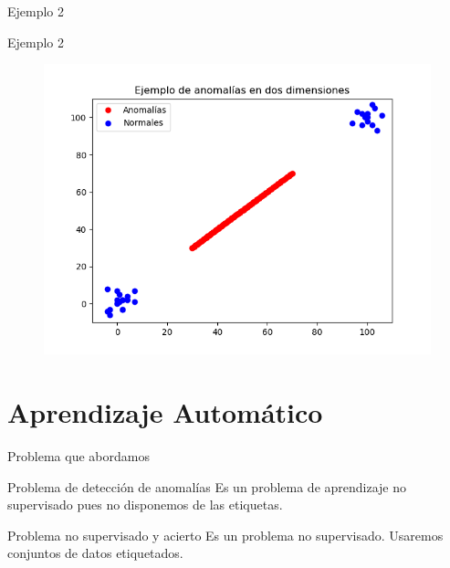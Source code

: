 \documentclass[10pt]{beamer}
\begin{document}
\begin{frame}[fragile]{Ejemplo 2}
\vspace{10px}
\centering
{}

\end{frame}

\begin{frame}[fragile]{Ejemplo 2}
\vspace{10px}

\begin{figure}
\centering
\includegraphics[scale=0.6]{Imagenes/outlier-2d-case2.png}
\end{figure}

\end{frame}

\section{Aprendizaje Automático}

\begin{frame}[fragile]{Problema que abordamos}
\vspace{10px}
\pause
{}

\begin{alertblock}{Problema de detección de anomalías}
	Es un problema de aprendizaje no supervisado pues no disponemos de las etiquetas.
\end{alertblock}

\pause

\begin{alertblock}{Problema no supervisado y acierto}
	Es un problema no supervisado. Usaremos conjuntos de datos etiquetados.
\end{alertblock}

\end{frame}
\end{document}
